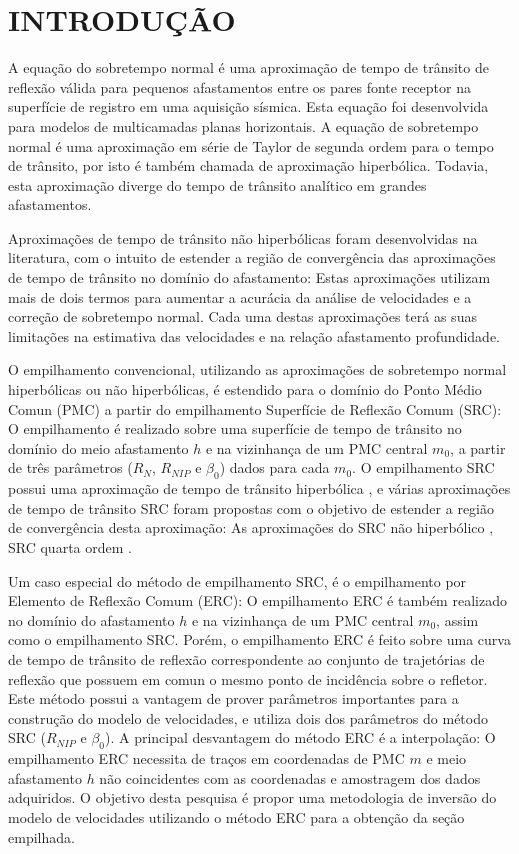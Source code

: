 \chapter{INTRODUÇÃO}
\label{cap1}

A equação do sobretempo normal \cite{dix} é uma aproximação de tempo de trânsito de reflexão válida para pequenos afastamentos
entre os pares fonte receptor na superfície de registro em uma aquisição sísmica. Esta equação foi desenvolvida para modelos de
multicamadas planas horizontais. 
A equação de sobretempo normal é uma aproximação em série de Taylor de segunda ordem para o tempo de trânsito, por isto é
também chamada de aproximação hiperbólica. Todavia, esta aproximação diverge do tempo de trânsito analítico
em grandes afastamentos.

Aproximações de tempo de trânsito não hiperbólicas foram desenvolvidas na literatura,
com o intuito de estender a região de convergência das
aproximações de tempo de trânsito no domínio do afastamento: Estas aproximações utilizam mais de dois termos para aumentar a 
acurácia da análise de velocidades e a correção de sobretempo normal. Cada uma destas aproximações terá
as suas limitações na estimativa das velocidades e na relação afastamento profundidade.

O empilhamento convencional, utilizando as aproximações de sobretempo normal hiperbólicas ou não hiperbólicas, é estendido
para o domínio do Ponto Médio Comun (PMC) a partir do empilhamento Superfície de Reflexão Comum (SRC): 
O empilhamento é realizado sobre uma superfície de tempo de
trânsito no domínio do meio afastamento $h$ e na vizinhança de um PMC central $m_0$, a partir de
três parâmetros ($R_N$, $R_{NIP}$ e $\beta_0$) dados para cada $m_0$.
O empilhamento SRC possui uma aproximação de tempo de trânsito hiperbólica \cite{jager}, e várias aproximações
de tempo de trânsito SRC foram propostas com o objetivo de estender a região de convergência desta aproximação:
As aproximações do SRC não hiperbólico \cite{fomel1}, SRC quarta ordem
\cite{germam}.

Um caso especial do método de empilhamento SRC, é o empilhamento por Elemento de Reflexão Comum (ERC):
O empilhamento ERC é também realizado no domínio do afastamento $h$ e na vizinhança de um PMC central $m_0$, assim como o
empilhamento SRC. Porém, o empilhamento ERC é feito sobre uma curva de tempo de trânsito de reflexão correspondente ao
conjunto de trajetórias de reflexão que possuem em comun
o mesmo ponto de incidência sobre o refletor.
Este método possui a vantagem de prover
parâmetros importantes para a construção do modelo de velocidades, e utiliza dois dos parâmetros
do método SRC ($R_{NIP}$ e $\beta_0$).
A principal desvantagem do método ERC é a interpolação: O empilhamento ERC necessita de 
traços em coordenadas de PMC $m$ e meio afastamento $h$ não coincidentes com as coordenadas
e amostragem dos dados adquiridos.
O objetivo desta pesquisa é propor uma metodologia de inversão do modelo de velocidades utilizando o método ERC para
a obtenção da seção empilhada. 

